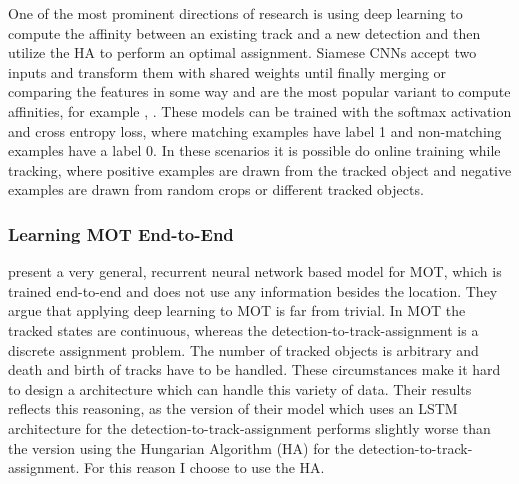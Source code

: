 \documentclass[12pt,a4paper]{article}
\begin{document}
One of the most prominent directions of research is using deep learning to compute the affinity between an existing track and a new detection and then utilize the HA to perform an optimal assignment. Siamese CNNs accept two inputs and transform them with shared weights until finally merging or comparing the features in some way and are the most popular variant to compute affinities, for example \cite{dual_matching}, \cite{siamese}. These models can be trained with the softmax activation and cross entropy loss, where matching examples have label 1 and non-matching examples have a label 0. In these scenarios it is possible do online training while tracking, where positive examples are drawn from the tracked object and negative examples are drawn from random crops or different tracked objects.


\subsubsection{Learning MOT End-to-End}

\cite{milan_rnn_tracking} present a very general, recurrent neural network based model for MOT, which is trained end-to-end and does not use any information besides the location. They argue that applying deep learning to MOT is far from trivial. In MOT the tracked states are continuous, whereas the detection-to-track-assignment is a discrete assignment problem. The number of tracked objects is arbitrary and death and birth of tracks have to be handled. These circumstances make it hard to design a architecture which can handle this variety of data. Their results reflects this reasoning, as the version of their model which uses an LSTM architecture for the detection-to-track-assignment performs slightly worse than the version using the Hungarian Algorithm (HA) for the detection-to-track-assignment. For this reason I choose to use the HA.
\end{document}

